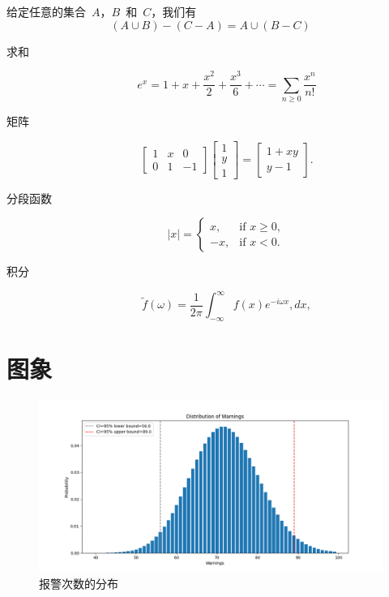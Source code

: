 \documentclass{cls/simplereport}
\begin{document}
\begin{theorem}
	给定任意的集合 $A$，$B$ 和 $C$，我们有
	$$ (A\cup B)-(C-A) = A \cup (B-C)$$
\end{theorem}

\begin{description}
	\item [求和]
	\begin{equation}
		e^x = 1 + x + \frac{x^2}{2} + \frac{x^3}{6} + \cdots = \sum_{n\geq 0} \frac{x^n}{n!}
	\end{equation}
	\item[矩阵] 
	\begin{equation}
		\begin{bmatrix}
			1 & x & 0 \\
			0 & 1 & -1
		\end{bmatrix}\begin{bmatrix}
			1  \\
			y  \\
			1
		\end{bmatrix}
		=\begin{bmatrix}
			1+xy  \\
			y-1
		\end{bmatrix}.
	\end{equation}
	
	\item[分段函数] 
	\[
	|x|=\begin{cases}
		x, & \text{if } x \geq 0,  \\
		-x, & \text{if } x < 0.
	\end{cases}
	\]
	
	\item[积分]
	\[
	\tilde f(\omega)=\frac{1}{2\pi}
	\int_{-\infty}^\infty f(x)e^{-i\omega x}, dx,
	\]
	
\end{description}
	
\section{图象}

\begin{figure}[h]
	\centering
	\includegraphics[scale=0.4]{example-report-gfx/eg_dist}
	\caption{报警次数的分布}
\end{figure}
\end{document}
